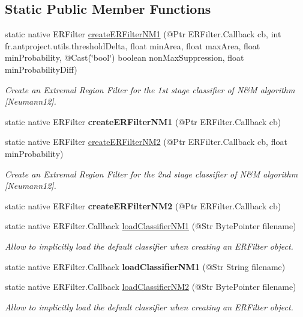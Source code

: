 \subsection*{Static Public Member Functions}
\begin{DoxyCompactItemize}
\item 
static native E\+R\+Filter \hyperlink{group__text__detect_ga0c01c194688152f569f28f7845cbfbaf}{create\+E\+R\+Filter\+N\+M1} (@Ptr E\+R\+Filter.\+Callback cb, int fr.antproject.utils.threshold\+Delta, float min\+Area, float max\+Area, float min\+Probability, @Cast(\char`\"{}bool\char`\"{}) boolean non\+Max\+Suppression, float min\+Probability\+Diff)
\begin{DoxyCompactList}\small\item\em Create an Extremal Region Filter for the 1st stage classifier of N\&M algorithm \mbox{[}Neumann12\mbox{]}. \end{DoxyCompactList}\item 
static native E\+R\+Filter {\bfseries create\+E\+R\+Filter\+N\+M1} (@Ptr E\+R\+Filter.\+Callback cb)
\item 
static native E\+R\+Filter \hyperlink{group__text__detect_ga941eba7519bae9c44d6cbd21d21ad26e}{create\+E\+R\+Filter\+N\+M2} (@Ptr E\+R\+Filter.\+Callback cb, float min\+Probability)
\begin{DoxyCompactList}\small\item\em Create an Extremal Region Filter for the 2nd stage classifier of N\&M algorithm \mbox{[}Neumann12\mbox{]}. \end{DoxyCompactList}\item 
static native E\+R\+Filter {\bfseries create\+E\+R\+Filter\+N\+M2} (@Ptr E\+R\+Filter.\+Callback cb)
\item 
static native E\+R\+Filter.\+Callback \hyperlink{group__text__detect_gaa43a04b9408663608d30f5bcdaadac16}{load\+Classifier\+N\+M1} (@Str Byte\+Pointer filename)
\begin{DoxyCompactList}\small\item\em Allow to implicitly load the default classifier when creating an E\+R\+Filter object. \end{DoxyCompactList}\item 
static native E\+R\+Filter.\+Callback {\bfseries load\+Classifier\+N\+M1} (@Str String filename)
\item 
static native E\+R\+Filter.\+Callback \hyperlink{group__text__detect_gaa41f7358b2e47c7e2b2831ad76410221}{load\+Classifier\+N\+M2} (@Str Byte\+Pointer filename)
\begin{DoxyCompactList}\small\item\em Allow to implicitly load the default classifier when creating an E\+R\+Filter object. \end{DoxyCompactList}\item 

\end{DoxyCompactItemize}
